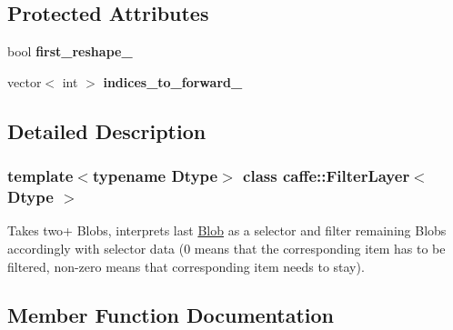\subsection*{Protected Attributes}
\begin{DoxyCompactItemize}
\item 
\mbox{\label{classcaffe_1_1_filter_layer_a0bfd8003e455c2f3a67172247058604b}} 
bool {\bfseries first\+\_\+reshape\+\_\+}
\item 
\mbox{\label{classcaffe_1_1_filter_layer_aafffdc214aa5ed398ddde27a075f0680}} 
vector$<$ int $>$ {\bfseries indices\+\_\+to\+\_\+forward\+\_\+}
\end{DoxyCompactItemize}


\subsection{Detailed Description}
\subsubsection*{template$<$typename Dtype$>$\newline
class caffe\+::\+Filter\+Layer$<$ Dtype $>$}

Takes two+ Blobs, interprets last \mbox{\hyperlink{classcaffe_1_1_blob}{Blob}} as a selector and filter remaining Blobs accordingly with selector data (0 means that the corresponding item has to be filtered, non-\/zero means that corresponding item needs to stay). 

\subsection{Member Function Documentation}
\mbox{\label{classcaffe_1_1_filter_layer_a11e002d2b3294ca185a01c007995711d}} 
